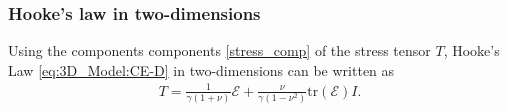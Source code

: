 \documentclass[../../main.tex]{subfiles}
\begin{document}
\subsubsection{Hooke's law in two-dimensions}
Using the components components \eqref{stress_comp} of the stress tensor $T$, Hooke's Law \eqref{eq:3D_Model:CE-D} in two-dimensions can be written as 
\begin{eqnarray}
	T = \frac{1}{\gamma(1+\nu)}\mathcal{E} + \frac{\nu}{\gamma(1-\nu^2)}\textrm{tr}(\mathcal{E}) I. 
\end{eqnarray}
\end{document}
